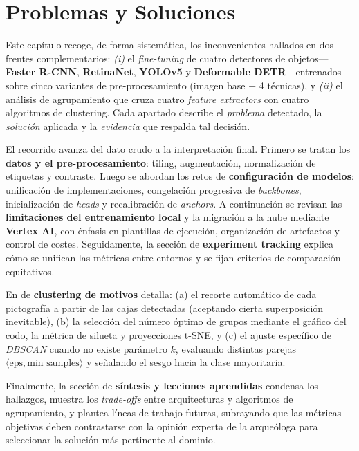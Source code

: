 \chapter{Problemas y Soluciones}\label{ch:problemas_y_soluciones}
\noindent
Este capítulo recoge, de forma sistemática, los inconvenientes hallados en dos frentes complementarios:
\emph{(i)} el \emph{fine-tuning} de cuatro detectores de objetos—\textbf{Faster R-CNN}, \textbf{RetinaNet}, \textbf{YOLOv5} y \textbf{Deformable DETR}—entrenados sobre cinco variantes de pre-procesamiento (imagen base + 4 técnicas), y
\emph{(ii)} el análisis de agrupamiento que cruza cuatro \emph{feature extractors} con cuatro algoritmos de clustering.
Cada apartado describe el \emph{problema} detectado, la \emph{solución} aplicada y la \emph{evidencia} que respalda tal decisión.

El recorrido avanza del dato crudo a la interpretación final.
Primero se tratan los \textbf{datos y el pre-procesamiento}: tiling, augmentación, normalización de etiquetas y contraste.
Luego se abordan los retos de \textbf{configuración de modelos}: unificación de implementaciones, congelación progresiva de \emph{backbones}, inicialización de \emph{heads} y recalibración de \emph{anchors}.
A continuación se revisan las \textbf{limitaciones del entrenamiento local} y la migración a la nube mediante \textbf{Vertex AI}, con énfasis en plantillas de ejecución, organización de artefactos y control de costes.
Seguidamente, la sección de \textbf{experiment tracking} explica cómo se unifican las métricas entre entornos y se fijan criterios de comparación equitativos.

En de \textbf{clustering de motivos} detalla:
(a) el recorte automático de cada pictografía a partir de las cajas detectadas (aceptando cierta superposición inevitable),
(b) la selección del número óptimo de grupos mediante el gráfico del codo, la métrica de silueta y proyecciones t-SNE,
y (c) el ajuste específico de \textit{DBSCAN} cuando no existe parámetro \(k\), evaluando distintas parejas \(\langle\text{eps},\text{min\_samples}\rangle\) y señalando el sesgo hacia la clase mayoritaria.

Finalmente, la sección de \textbf{síntesis y lecciones aprendidas} condensa los hallazgos, muestra los \emph{trade-offs} entre arquitecturas y algoritmos de agrupamiento, y plantea líneas de trabajo futuras, subrayando que las métricas objetivas deben contrastarse con la opinión experta de la arqueóloga para seleccionar la solución más pertinente al dominio.
